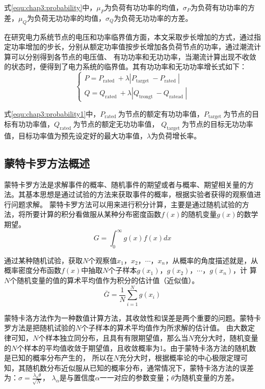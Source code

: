 式\ref{equ:chap3:probability}中，$\mu_{P}$为负荷有功功率的均值，$\sigma_{P}$为负荷有功功率的方差，$\mu_{Q}$为负荷无功功率的均值，$\sigma_{Q}$为负荷无功功率的方差。

在研究电力系统节点的电压和功率临界值方面，本文采取步长增加的方式，通过指定功率增加的步长，分别从额定功率值按步长增加各负荷节点的功率，通过潮流计算可以分别得到各节点的电压值、
有功功率和无功功率，当潮流计算出现不收敛的状态时，便得到了电力系统的临界值。其有功功率和无功功率增长式如下：
\begin{equation}
  \label{equ:chap3:probability1}
  \left\{\begin{array}{l}{P=P_{\text {rated }}+\lambda\left|P_{\text {target }}-P_{\text {rated }}\right|} \\
   {Q=Q_{\text {rated }}+\lambda\left|Q_{\text {trongt }}-Q_{\text {ratead }}\right|}\end{array}\right.
\end{equation}

式\ref{equ:chap3:probability1}中，$P_{\text {rated }}$为节点的额定有功功率值，$P_{\text {target }}$为节点的目标有功功率值，$Q_{\text {rated }}$为节点的额定无功功率值，
$Q_{\text {target }}$为节点的目标无功功率值，目标功率值为预先设定好的最大功率值，$\lambda$为负荷增长率。


\subsection{蒙特卡罗方法概述}
\label{sec:vulneStaus}
蒙特卡罗方法是求解事件的概率、随机事件的期望或者与概率、期望相关量的方法。其基本思想是通过试验的方法来获取事件的概率，根据实验者获得的观察值进行问题求解\cite{refs73,refs74,refs75}。
蒙特卡罗方法可以用来进行积分计算，主要是通过随机试验的方法，将所要计算的积分看做服从某种分布密度函数$f(x)$的随机变量$g(x)$的数学期望。
\begin{equation}
  G=\int_{0}^{\infty} g(x) f(x) d x
  \end{equation}

通过某种随机试验，获取$N$个观察值$x_1，x_2，\cdots，x_n$，从概率的角度描述就是，从概率密度分布函数$f(x)$中抽取$N$个子样本$g(x_1 )，g(x_2 )，\cdots，g(x_n )$，计
算$N$个随机变量的值的算术平均值作为积分的估计值（近似值）。
\begin{equation}
  \bar{G}=\frac{1}{N} \sum_{i=1}^{N} g\left(x_{i}\right)
\end{equation}

蒙特卡洛方法作为一种数值计算方法，其收敛性和误差是两个重要的问题。蒙特卡罗方法是把随机试验的$N$个子样本的算术平均值作为所求解的估计值。
由大数定律可知，$N$个样本独立同分布，且具有有限期望值，那么当$N$充分大时，随机变量的$N$个样本的平均值收敛于期望值，且收敛概率为1。由于蒙特卡洛方法的随机数是已知的概率分布产生的，
所以在$N$充分大时，根据概率论的中心极限定理可知，其随机数分布近似服从已知的概率分布，通常情况下，蒙特卡洛方法的误差为：$\sigma = \frac{\lambda_{\alpha} \theta}{\sqrt{N}}$，
$\lambda_{\alpha}$是与置信度$\alpha$一一对应的参数变量；$\theta$为随机变量的方差。


